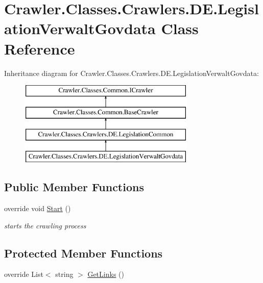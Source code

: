 \hypertarget{class_crawler_1_1_classes_1_1_crawlers_1_1_d_e_1_1_legislation_verwalt_govdata}{\section{Crawler.\-Classes.\-Crawlers.\-D\-E.\-Legislation\-Verwalt\-Govdata Class Reference}
\label{class_crawler_1_1_classes_1_1_crawlers_1_1_d_e_1_1_legislation_verwalt_govdata}
}
Inheritance diagram for Crawler.\-Classes.\-Crawlers.\-D\-E.\-Legislation\-Verwalt\-Govdata\-:\begin{figure}[H]
\begin{center}
\leavevmode
\includegraphics[height=4.000000cm]{class_crawler_1_1_classes_1_1_crawlers_1_1_d_e_1_1_legislation_verwalt_govdata}
\end{center}
\end{figure}
\subsection*{Public Member Functions}
\begin{DoxyCompactItemize}
\item 
override void \hyperlink{class_crawler_1_1_classes_1_1_crawlers_1_1_d_e_1_1_legislation_verwalt_govdata_a5eecceedce63ecae49d8a19b810d578a}{Start} ()
\begin{DoxyCompactList}\small\item\em starts the crawling process \end{DoxyCompactList}\end{DoxyCompactItemize}
\subsection*{Protected Member Functions}
\begin{DoxyCompactItemize}
\item 
override List$<$ string $>$ \hyperlink{class_crawler_1_1_classes_1_1_crawlers_1_1_d_e_1_1_legislation_verwalt_govdata_ad297d7d202e549343e3f1aa8b26229fa}{Get\-Links} ()
\end{DoxyCompactItemize}
